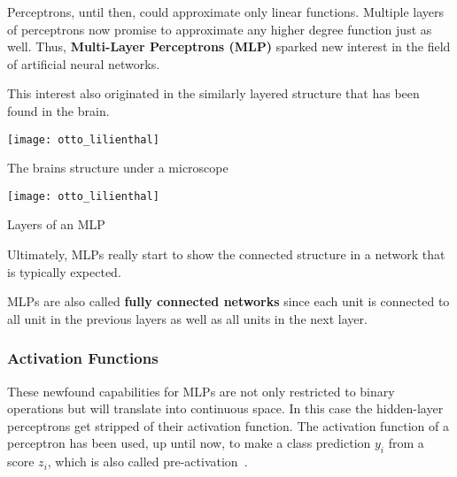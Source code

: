 
Perceptrons, until then, could approximate only linear functions.
Multiple layers of perceptrons now promise to approximate any higher degree function just as well.
Thus, \textbf{Multi-Layer Perceptrons (MLP)} sparked new interest in the field of artificial neural networks.

This interest also originated in the similarly layered structure that has been found in the brain.
\begin{marginfigure}
    \texttt{[image: otto\_lilienthal]}
    \caption[]{The brains structure under a microscope}
\end{marginfigure}
\begin{marginfigure}
    \texttt{[image: otto\_lilienthal]}
    \caption[]{Layers of an MLP}
\end{marginfigure}
Ultimately, MLPs really start to show the connected structure in a network that is typically expected.

MLPs are also called \textbf{fully connected networks} since each unit is connected to all unit in the previous layers as well as all units in the next layer.



\subsubsection{Activation Functions}
These newfound capabilities for MLPs are not only restricted to binary operations but will translate into continuous space.
In this case the hidden-layer perceptrons get stripped of their activation function.
The activation function of a perceptron has been used, up until now, to make a class prediction $y_i$ from a score $z_i$, which is also called pre-activation~\cite[p.~6]{grosse}.

